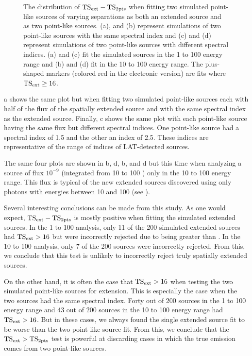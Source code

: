 \begin{figure}[htbp]
    \fi
    \caption{
    The distribution of $\mathrm{TS}_\mathrm{ext}-\mathrm{TS}_{\mathrm{2pts}}$ when fitting two simulated
    point-like sources of varying separations as
    both an extended source and as two point-like sources.  (a),
    and (b) represent simulations of two point-like sources with the
    same spectral index and (c) and (d) represent simulations of two
    point-like sources with different spectral indices.  (a) and (c)
    fit the simulated sources in the 1 \gev to 100 \gev energy range
    and (b) and (d) fit in the 10 \gev to 100 \gev energy range.
    The plus-shaped markers (colored red in the electronic version)
    are fits where $\mathrm{TS}_\mathrm{ext}\ge16$.
    }
  \end{figure}

a shows the same plot but when fitting
two simulated point-like sources each with half of the flux of
the spatially extended source and with the same spectral index as the
extended source.  Finally, c shows the same
plot with each point-like source having the same flux but different
spectral indices.  One point-like source had a spectral index of 1.5
and the other an index of 2.5.
These indices are representative of the range of indices of LAT-detected
sources.

The same four plots are shown in b, d, 
b, and d but this
time when analyzing a source of flux $10^{-9}$ \fluxunits (integrated from
10 \gev to 100 \gev) only in the 10 \gev to 100 \gev energy range.
This flux is typical of the new extended sources discovered
using only photons with energies between 10 \gev and 100 \gev (see
).

Several interesting conclusions can be made from this study.  As one would
expect, $\mathrm{TS}_\mathrm{ext}-\mathrm{TS}_{\mathrm{2pts}}$ is mostly positive when fitting the simulated
extended sources.  In the 1 \gev to 100 \gev analysis, only 11 of the
200 simulated extended sources had $\mathrm{TS}_\mathrm{ext}>16$ but were incorrectly
rejected due to \tsinc being greater than \tsext.  In the 10 \gev to 100 \gev
analysis, only 7 of the 200 sources were incorrectly rejected. From this,
we conclude that this test is unlikely to incorrectly reject truly
spatially extended sources.

On the other hand, 
it is often
the case that $\mathrm{TS}_\mathrm{ext}>16$ when testing the 
two simulated point-like sources
for extension.  This is especially the case
when the two sources had the same spectral index. Forty out of 200 sources
in the 1 \gev to 100 \gev energy range and 43 out of 200 sources in the
10 \gev to 100 \gev energy range had $\mathrm{TS}_\mathrm{ext}>16$.  But in these cases,
we always found the single extended source fit to be worse than
the two point-like source fit.  From this, we conclude that the $\mathrm{TS}_\mathrm{ext}>\mathrm{TS}_{\mathrm{2pts}}$
test is powerful at discarding cases in which the true emission comes
from two point-like sources.


